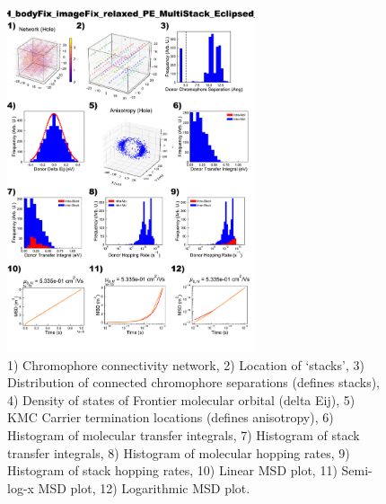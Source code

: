 \documentclass[12pt]{article}
\begin{document}
\begin{figure}[h]\centering
	\includegraphics[width=0.65\textwidth]{Figures/VRH_bodyFix_imageFix_relaxed_PE_MultiStack_Eclipsed_AA.png}
    \caption{   1) Chromophore connectivity network, 
                2) Location of `stacks', 
                3) Distribution of connected chromophore separations (defines stacks),
                4) Density of states of Frontier molecular orbital (delta Eij),
                5) KMC Carrier termination locations (defines anisotropy),
                6) Histogram of molecular transfer integrals,
                7) Histogram of stack transfer integrals,
                8) Histogram of molecular hopping rates,
                9) Histogram of stack hopping rates,
                10) Linear MSD plot,
                11) Semi-log-x MSD plot,
                12) Logarithmic MSD plot.}
	\label{fig:VRHPEMultEcl}
\end{figure}
\end{document}

